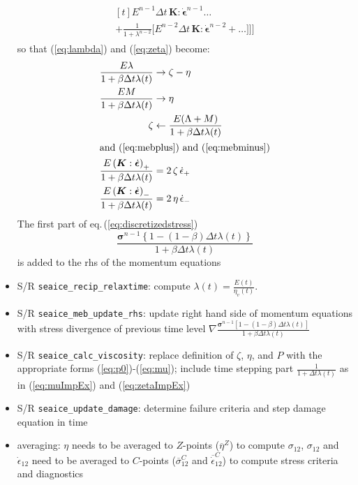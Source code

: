 \documentclass[12pt]{article}
\newcommand{\sr}{\dot{\epsilon}}
\newcommand{\srb}{\dot{\bm{\epsilon}}}
\begin{document}
\begin{itemize}
\begin{align}
\begin{gathered}[t]
                  E^{n-1}\Delta{t}\,\bm{K}:\srb^{n-1} \ldots \\
                  + \frac{1}{1+\lambda^{n-2}} \biggl[
                   E^{n-2}\Delta{t}\,\bm{K}:\srb^{n-2} + \dots
                   \biggr]\biggr]\biggr]
                 \end{gathered}
  \end{align}
  so that (\ref{eq:lambda}) and (\ref{eq:zeta}) become:
  \begin{align}
    \label{eq:lambdaImpEx}
    \frac{E\lambda}{1+\beta\Delta{t}\lambda(t)}
                                   &\rightarrow \zeta - \eta \\
    \label{eq:muImpEx}
    \frac{EM}{1+\beta\Delta{t}\lambda(t)}&\rightarrow \eta \\
    \label{eq:zetaImpEx}\zeta &\leftarrow
                                \frac{E(\Lambda+M)}
            {1+\beta\Delta{t}\lambda(t)} \\
    \intertext{and (\ref{eq:mebplus}) and (\ref{eq:mebminus})}
    \label{eq:mebplusImpEx}
    \frac{E\left(\bm{K}:\srb\right)_{+}}{1+\beta\Delta{t}\lambda(t)}
                                   &= 2\,\zeta\,\sr_{+}\\
    \label{eq:mebminusImpEx}
    \frac{E\left(\bm{K}:\srb\right)_{-}}{1+\beta\Delta{t}\lambda(t)}
                                   &= 2\, \eta\,\sr_{-}
  \end{align}
  The first part of eq.\,(\ref{eq:discretizedstress}) \[\frac{\bm{\sigma}^{n-1}                     \left\{1-(1-\beta)\Delta{t}\lambda(t)\right\}}                  {1+\beta\Delta{t}\lambda(t)}\] is added to the rhs of the momentum equations
\item S/R \verb+seaice_recip_relaxtime+: compute $\lambda(t) = \frac{E(t)}{\eta_{v}(t)}$.
\item S/R \verb+seaice_meb_update_rhs+: update right hand side of momentum equations with stress divergence of previous time level $\nabla\frac{\bm{\sigma}^{n-1}[1-(1-\beta)\Delta{t}\lambda(t)]}{1+\beta\Delta{t}\lambda(t)}$
\item S/R \verb+seaice_calc_viscosity+: replace definition of $\zeta$, $\eta$, and $P$ with the appropriate forms (\ref{eq:p0})-(\ref{eq:mu}); include time stepping part $\frac{1}{1+\Delta{t}\lambda(t)}$ as in (\ref{eq:muImpEx}) and (\ref{eq:zetaImpEx})
\item S/R \verb+seaice_update_damage+: determine failure criteria and step damage equation in time 
\item averaging: $\eta$ needs to be averaged to $Z$-points ($\overline{\eta}^{Z}$) to compute $\sigma_{12}$, $\sigma_{12}$ and $\sr_{12}$ need to be averaged to $C$-points ($\overline{\sigma}_{12}^{C}$ and $\overline{\sr}_{12}^{C}$) to compute stress criteria and diagnostics

\end{itemize}
\end{document}
